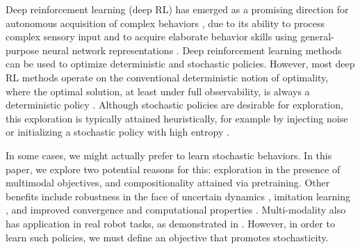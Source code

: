 \documentclass{article}
\begin{document}
%
%
%
%
%
%
%
%
%
%
%
Deep reinforcement learning (deep RL) has emerged as a promising direction for autonomous acquisition of complex behaviors \cite{mnih2015human,silver2016mastering}, due to its ability to process complex sensory input \cite{jaderberg2016reinforcement} and to acquire elaborate behavior skills using general-purpose neural network representations \cite{levine2016end}. Deep reinforcement learning methods can be used to optimize deterministic \cite{lillicrap2015continuous} and stochastic \cite{schulman2015trust, mnih2016asynchronous} policies. However, most deep RL methods operate on the conventional deterministic notion of optimality, where the optimal solution, at least under full observability, is always a deterministic policy \cite{sutton1998reinforcement}. Although stochastic policies are desirable for exploration, this exploration is typically attained heuristically, for example by injecting noise \cite{silver2014deterministic, lillicrap2015continuous, mnih2015human} or initializing a stochastic policy with high entropy \cite{kakade2002natural, schulman2015trust, mnih2016asynchronous}.

%
In some cases, we might actually prefer to learn stochastic behaviors. In this paper, we explore two potential reasons for this: exploration in the presence of multimodal objectives, and compositionality 
%
attained via pretraining. Other benefits include robustness in the face of uncertain dynamics \cite{ziebart2010modeling}, imitation learning \cite{ziebart2008maximum}, and improved convergence and computational properties \cite{gu2016q}. Multi-modality also has application in real robot tasks, as demonstrated in \cite{daniel2012hierarchical}. However, in order to learn such policies, we must define an objective that promotes stochasticity. 
\end{document}
